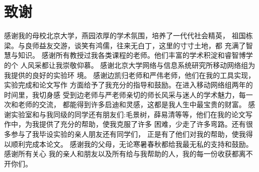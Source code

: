 
\chapter{致谢}
感谢我的母校北京大学，燕园浓厚的学术氛围，培养了一代代社会精英，
祖国栋梁。与良师益友交游，谈笑有鸿儒，往来无白丁，这里的寸寸土地，都
充满了智慧与知识。
  感谢所有教授过我各类课程的老师。他们丰富的学术积淀和睿智博学的个
人风采都让我崇敬仰慕。
  感谢北京大学网络与信息系统研究所移动网络组为我提供的良好的实验环
境。
感谢边凯归老师和严伟老师，他们在我的工具实现，实验完成和论文写作 方面给予了我充分的指导和鼓励。在进入移动网络组两年的时间里，我切身感 受到边老师与严老师亲切的师长风采与迷人的学术魅力，每一次和老师的交流， 都能得到许多启迪和灵感，这都是我人生中最宝贵的财富。
  感谢实验室和与我同级的同学还有朋友们:毛景树，薛易清等等，他们在我的论文写作中，为我提供了充分的帮助，使我克服了许多
困难，少走了许多弯路。还有很多参与了我毕设实验的亲人朋友还有同学们，
正是有了他们对我的帮助，使我得以顺利完成本论文。
  感谢我的父母，无论寒暑春秋都给我最无私的支持和鼓励。感谢所有关心
我的亲人和朋友以及所有给与我帮助的人，我的每一份收获都离不开你们。

